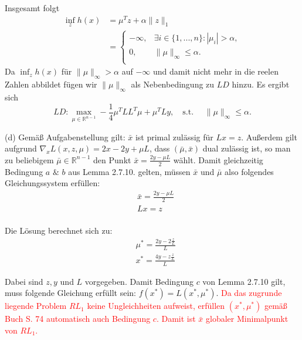 \documentclass[ngerman, a4paper,12pt]{article}
\begin{document}
Insgesamt folgt 
\begin{equation*}
	\begin{split}
		\inf_z h(x) &=  \mu^Tz+\alpha\|z\|_1 \\
		&=\begin{cases}
		-\infty,&\exists i \in \{1,..., n\}:|\mu_i | >\alpha,\\
		0,&\|\mu\|_\infty\leq\alpha.\\
		\end{cases}
	\end{split}
\end{equation*}
Da $\inf_z h(x)$ für $\| \mu \|_{\infty} > \alpha $ auf $-\infty$ und damit nicht mehr in die reelen Zahlen abbildet fügen wir $\| \mu \|_{\infty}$ als Nebenbedingung zu $LD$ hinzu. Es ergibt sich
\begin{equation*}
  LD:  \max_{\mu \in \mathbb{R}^{n-1}} -\frac{1}{4}\mu^TLL^T\mu + \mu^TLy,\quad \text{s.t. } \quad \|\mu\|_\infty\leq\alpha.
\end{equation*}

\par
(d) 
Gemäß Aufgabenstellung gilt: $\bar x$ ist primal zulässig für $Lx=z$. Außerdem gilt aufgrund $\nabla_x L(x,z,\mu)=2x-2y+\mu L$, dass $(\bar\mu,\bar x)$ dual zulässig ist, so man zu beliebigem $\bar \mu\in \mathbb R^{n-1}$ den Punkt $\bar x=\frac{2y-\mu L}{2}$ wählt. Damit gleichzeitig Bedingung $a$ $\&$ $b$ aus Lemma 2.7.10. gelten, müssen $\bar x$ und  $\bar \mu$ also folgendes Gleichungssystem erfüllen:
\begin{equation*}
  \begin{split}
  	&\bar x=\frac{2y-\mu L}{2}\\
  	&Lx=z\\
  \end{split}
\end{equation*}

Die Lösung berechnet sich zu:
\begin{equation*}
  \begin{split}
  	&\mu^*=\frac{2y-2\frac{z}{L}}{L}\\
  	&x^*=\frac{4y-z\frac{z}{L}}{L}
  \end{split}
\end{equation*}

Dabei sind $z,y$ und $L$ vorgegeben. Damit Bedingung $c$ von Lemma 2.7.10 gilt, muss folgende Gleichung erfüllt sein: $f(x^*)=L(x^*,\mu^*)$.
\textcolor{red}{Da das zugrunde liegende Problem $RL_1$ keine Ungleichheiten aufweist, erfüllen $(x^*,\mu^*)$ gemäß Buch S. 74 automatisch auch Bedingung $c$. Damit ist $\bar x$ globaler Minimalpunkt von $RL_1$.}
\end{document}

